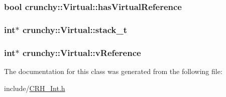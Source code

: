 \subsubsection[{has\+Virtual\+Reference}]{\setlength{\rightskip}{0pt plus 5cm}bool crunchy\+::\+Virtual\+::has\+Virtual\+Reference}\label{classcrunchy_1_1_virtual_a9dd9b11712ab44b00696838fc1da2c43}
\hypertarget{classcrunchy_1_1_virtual_ad108e31577fcad0d6ff9ff6d7b3d5249}{}
\subsubsection[{stack\+\_\+t}]{\setlength{\rightskip}{0pt plus 5cm}int$\ast$ crunchy\+::\+Virtual\+::stack\+\_\+t\hspace{0.3cm}{\ttfamily [static]}}\label{classcrunchy_1_1_virtual_ad108e31577fcad0d6ff9ff6d7b3d5249}
\hypertarget{classcrunchy_1_1_virtual_acf317286283a3916ccb1d4752074af5f}{}
\subsubsection[{v\+Reference}]{\setlength{\rightskip}{0pt plus 5cm}int$\ast$ crunchy\+::\+Virtual\+::v\+Reference}\label{classcrunchy_1_1_virtual_acf317286283a3916ccb1d4752074af5f}


The documentation for this class was generated from the following file\+:\begin{DoxyCompactItemize}
\item 
include/\hyperlink{_c_r_h___int_8h}{C\+R\+H\+\_\+\+Int.\+h}\end{DoxyCompactItemize}
